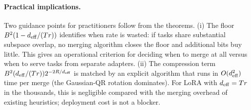 \paragraph{Practical implications.} Two guidance points for
practitioners follow from the theorems. (i) The floor
$B^2(1 - d_{\mathrm{eff}}/(Tr))$ identifies when rate is wasted: if tasks
share substantial subspace overlap, no merging algorithm closes
the floor and additional bits buy little. This gives an
operational criterion for deciding when to merge at all versus
when to serve tasks from separate adapters. (ii) The
compression term $B^2 (d_{\mathrm{eff}}/(Tr)) 2^{-2R/d_{\mathrm{eff}}}$ is matched by
an explicit algorithm that runs in $O(d_{\mathrm{eff}}^2)$ time per merge
(the Gaussian-QR rotation dominates). For LoRA with $d_{\mathrm{eff}} = Tr$
in the thousands, this is negligible compared with the merging
overhead of existing heuristics; deployment cost is not a
blocker.

